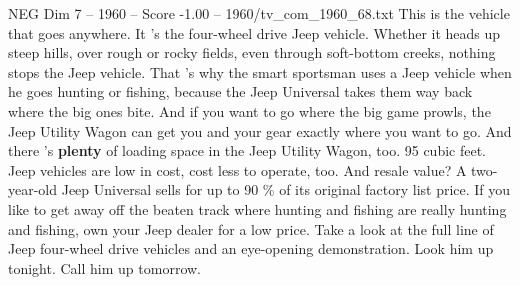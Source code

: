 \begin{textsample}{NEG Dim 7 – 1960 – Score -1.00 – 1960/tv\_com\_1960\_68.txt}  \label{ex:f7_neg_075}
This is the vehicle that goes anywhere.
It 's the four-wheel drive Jeep vehicle.
Whether it heads up steep hills, over rough or rocky fields, even through soft-bottom creeks, nothing stops the Jeep vehicle.
That 's why the smart sportsman uses a Jeep vehicle when he goes hunting or fishing, because the Jeep Universal takes them way back where the big ones bite.
And if you want to go where the big game prowls, the Jeep Utility Wagon can get you and your gear exactly where you want to go.
And there 's \textbf{plenty} of loading space in the Jeep Utility Wagon, too. 95 cubic feet.
Jeep vehicles are low in cost, cost less to operate, too.
And resale value?
A two-year-old Jeep Universal sells for up to 90 \% of its original factory list price.
If you like to get away off the beaten track where hunting and fishing are really hunting and fishing, own your Jeep dealer for a low price.
Take a look at the full line of Jeep four-wheel drive vehicles and an eye-opening demonstration.
Look him up tonight.
Call him up tomorrow.

\end{textsample}
